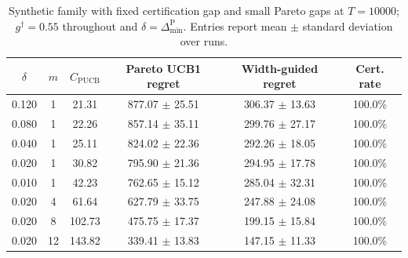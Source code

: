 \begin{table}[t]
\centering
\caption{Synthetic family with fixed certification gap and small Pareto gaps at $T=10000$; $g^\dagger=0.55$ throughout and $\delta=\Delta_{\min}^{\mathrm{P}}$. Entries report mean $\pm$ standard deviation over runs.}
\label{tab:neurips-pucb-vs-width}
\small
\begin{tabular}{cccccc}
\hline
$\delta$ & $m$ & $C_{\mathrm{PUCB}}$ & Pareto UCB1 regret & Width-guided regret & Cert. rate \\
\hline
0.120 & 1 & 21.31 & 877.07 $\pm$ 25.51 & 306.37 $\pm$ 13.63 & 100.0\% \\
0.080 & 1 & 22.26 & 857.14 $\pm$ 35.11 & 299.76 $\pm$ 27.17 & 100.0\% \\
0.040 & 1 & 25.11 & 824.02 $\pm$ 22.36 & 292.26 $\pm$ 18.05 & 100.0\% \\
0.020 & 1 & 30.82 & 795.90 $\pm$ 21.36 & 294.95 $\pm$ 17.78 & 100.0\% \\
0.010 & 1 & 42.23 & 762.65 $\pm$ 15.12 & 285.04 $\pm$ 32.31 & 100.0\% \\
0.020 & 4 & 61.64 & 627.79 $\pm$ 33.75 & 247.88 $\pm$ 24.08 & 100.0\% \\
0.020 & 8 & 102.73 & 475.75 $\pm$ 17.37 & 199.15 $\pm$ 15.84 & 100.0\% \\
0.020 & 12 & 143.82 & 339.41 $\pm$ 13.83 & 147.15 $\pm$ 11.33 & 100.0\% \\
\hline
\end{tabular}
\end{table}
